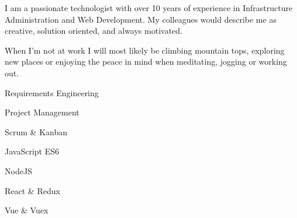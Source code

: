 




I am a passionate technologist with over 10 years of experience in
Infrastructure Administration and Web Development.
My colleagues would
describe me as
{\color{accent}creative},
{\color{accent}solution oriented},
and always {\color{accent}motivated}.

\vspace{1.9mm}

When I'm not at work I will most likely be climbing mountain tops, exploring new places or
enjoying the peace in mind when meditating, jogging or working out.



%

\makebox[0pt][l]{%
  \hspace{1.5cm}
  \raisebox{-\totalheight}[0pt][0pt]{%
   {\color{background}\fontsize{250}{48}\faLaptop}
}}%
Requirements Engineering \hfill{}\vspace{0.3cm}

Project Management \hfill{}\vspace{0.3cm}

Scrum \& Kanban \hfill{}\vspace{0.3cm}

JavaScript ES6 \hfill{}\vspace{0.3cm}

NodeJS \hfill{}\vspace{0.3cm}

React \& Redux \hfill{}\vspace{0.3cm}

Vue \& Vuex \hfill{}\vspace{0.3cm}

